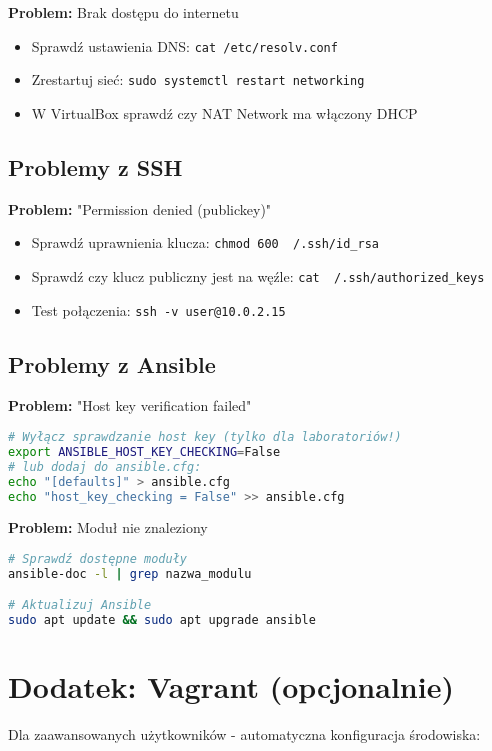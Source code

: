 \documentclass{article}
\begin{document}
\textbf{Problem:} Brak dostępu do internetu
\begin{itemize}
    \item Sprawdź ustawienia DNS: \texttt{cat /etc/resolv.conf}
    \item Zrestartuj sieć: \texttt{sudo systemctl restart networking}
    \item W VirtualBox sprawdź czy NAT Network ma włączony DHCP
\end{itemize}

\subsection*{Problemy z SSH}
\textbf{Problem:} "Permission denied (publickey)"
\begin{itemize}
    \item Sprawdź uprawnienia klucza: \texttt{chmod 600 ~/.ssh/id\_rsa}
    \item Sprawdź czy klucz publiczny jest na węźle: \texttt{cat ~/.ssh/authorized\_keys}
    \item Test połączenia: \texttt{ssh -v user@10.0.2.15}
\end{itemize}

\subsection*{Problemy z Ansible}
\textbf{Problem:} "Host key verification failed"
\begin{lstlisting}[language=bash]
# Wyłącz sprawdzanie host key (tylko dla laboratoriów!)
export ANSIBLE_HOST_KEY_CHECKING=False
# lub dodaj do ansible.cfg:
echo "[defaults]" > ansible.cfg
echo "host_key_checking = False" >> ansible.cfg
\end{lstlisting}

\textbf{Problem:} Moduł nie znaleziony
\begin{lstlisting}[language=bash]
# Sprawdź dostępne moduły
ansible-doc -l | grep nazwa_modulu

# Aktualizuj Ansible
sudo apt update && sudo apt upgrade ansible
\end{lstlisting}

\section*{Dodatek: Vagrant (opcjonalnie)}

Dla zaawansowanych użytkowników - automatyczna konfiguracja środowiska:
\end{document}

